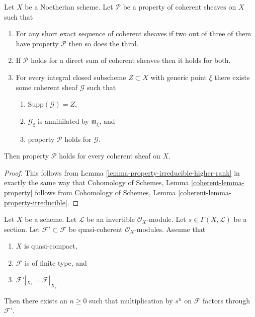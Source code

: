 \begin{lemma}
\label{lemma-property-higher-rank}
Let $X$ be a Noetherian scheme.
Let $\mathcal{P}$ be a property of coherent sheaves on $X$ such that
\begin{enumerate}
\item For any short exact sequence of coherent sheaves if two
out of three of them have property $\mathcal{P}$ then so does the
third.
\item If $\mathcal{P}$ holds for a direct sum of coherent sheaves
then it holds for both.
\item For every integral closed subscheme $Z \subset X$
with generic point $\xi$ there exists
some coherent sheaf $\mathcal{G}$ such that
\begin{enumerate}
\item $\text{Supp}(\mathcal{G}) = Z$,
\item $\mathcal{G}_\xi$ is annihilated by $\mathfrak m_\xi$, and
\item property $\mathcal{P}$ holds for $\mathcal{G}$.
\end{enumerate}
\end{enumerate}
Then property $\mathcal{P}$ holds for every coherent sheaf
on $X$.
\end{lemma}

\begin{proof}
This follows from Lemma \ref{lemma-property-irreducible-higher-rank}
in exactly the same way that
Cohomology of Schemes, Lemma \ref{coherent-lemma-property} follows from
Cohomology of Schemes, Lemma \ref{coherent-lemma-property-irreducible}.
\end{proof}

\begin{lemma}
\label{lemma-section-maps-back-into}
Let $X$ be a scheme.
Let $\mathcal{L}$ be an invertible $\mathcal{O}_X$-module.
Let $s \in \Gamma(X, \mathcal{L})$ be a section.
Let $\mathcal{F}' \subset \mathcal{F}$ be quasi-coherent
$\mathcal{O}_X$-modules. Assume that
\begin{enumerate}
\item $X$ is quasi-compact,
\item $\mathcal{F}$ is of finite type, and
\item $\mathcal{F}'|_{X_s} = \mathcal{F}|_{X_s}$.
\end{enumerate}
Then there exists an $n \geq 0$ such that
multiplication by $s^n$ on $\mathcal{F}$ factors
through $\mathcal{F}'$.
\end{lemma}


